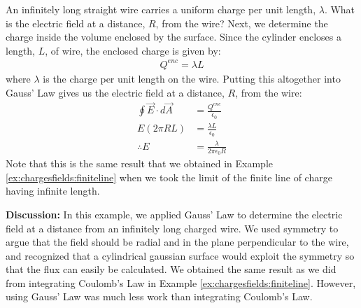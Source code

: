 \begin{example}{An infinitely long straight wire carries a uniform charge per unit length, $\lambda$. What is the electric field at a distance, $R$, from the wire?}
Next, we determine the charge inside the volume enclosed by the surface. Since the cylinder encloses a length, $L$, of wire, the enclosed charge is given by:
\begin{align*}
Q^{enc}=\lambda L
\end{align*}
where $\lambda$ is the charge per unit length on the wire. Putting this altogether into Gauss' Law gives us the electric field at a distance, $R$, from the wire:
\begin{align*}
\oint \vec E\cdot d\vec A&=\frac{Q^{enc}}{\epsilon_0} \\
E(2\pi R L) &= \frac{\lambda L}{\epsilon_0}\\
\therefore E&= \frac{\lambda}{2\pi\epsilon_0R}
\end{align*}
Note that this is the same result that we obtained in Example \ref{ex:chargesfields:finiteline} when we took the limit of the finite line of charge having infinite length.

\textbf{Discussion: }In this example, we applied Gauss' Law to determine the electric field at a distance from an infinitely long charged wire. We used symmetry to argue that the field should be radial and in the plane perpendicular to the wire, and recognized that a cylindrical gaussian surface would exploit the symmetry so that the flux can easily be calculated. We obtained the same result as we did from integrating Coulomb's Law in Example \ref{ex:chargesfields:finiteline}. However, using Gauss' Law was much less work than integrating Coulomb's Law.

\end{example}

